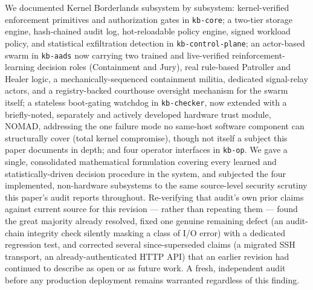 \documentclass{article}
\begin{document}
We documented Kernel Borderlands subsystem by subsystem: kernel-verified
enforcement primitives and authorization gates in \texttt{kb-core}; a
two-tier storage engine, hash-chained audit log, hot-reloadable policy
engine, signed workload policy, and statistical exfiltration detection
in \texttt{kb-control-plane}; an actor-based swarm in \texttt{kb-aads}
now carrying two trained and live-verified reinforcement-learning
decision roles (Containment and Jury), real rule-based Patroller and
Healer logic, a mechanically-sequenced containment militia, dedicated
signal-relay actors, and a registry-backed courthouse oversight
mechanism for the swarm itself; a stateless boot-gating watchdog in
\texttt{kb-checker}, now extended with a briefly-noted, separately and
actively developed hardware trust module, NOMAD, addressing the one
failure mode no same-host software component can structurally cover
(total kernel compromise), though not itself a subject this paper
documents in depth; and four operator interfaces in \texttt{kb-op}.
We gave a single, consolidated mathematical
formulation covering every learned and statistically-driven decision
procedure in the system, and subjected the four implemented,
non-hardware subsystems to the same source-level security scrutiny
this paper's audit reports throughout. Re-verifying that audit's own
prior claims against current source for this revision --- rather than
repeating them --- found the great majority already resolved, fixed
one genuine remaining defect (an audit-chain integrity check silently
masking a class of I/O error) with a dedicated regression test, and
corrected several since-superseded claims (a migrated SSH transport, an
already-authenticated HTTP API) that an earlier revision had continued
to describe as open or as future work. A fresh, independent audit
before any production deployment remains warranted regardless of this
finding.



\end{document}
